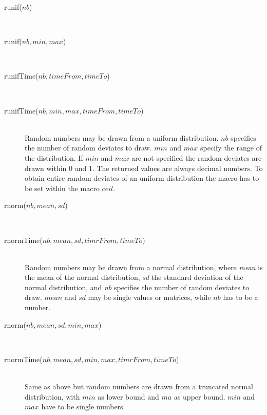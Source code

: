 \documentclass[letterpaper,12pt,oneside]{book}
\begin{document}
\begin{description}
\item[runif($nb$)]\hspace*{\fill}\\
\vspace{-9mm}
\item[runif($nb, min, max$)]\hspace*{\fill}\\
\vspace{-9mm}
\item[runifTime($nb, timeFrom, timeTo$)]\hspace*{\fill}\\
\vspace{-9mm}
\item[runifTime($nb, min, max, timeFrom, timeTo$)]\hspace*{\fill}\\
Random numbers may be drawn from a uniform distribution. $nb$ specifies the number of random deviates to draw. $min$ and $max$ specify the range of the distribution. If $min$ and $max$ are not specified the random deviates are drawn within 0 and 1. The returned values are always decimal numbers. To obtain entire random deviates of an uniform distribution the macro has to be set within the macro $ceil$.

\item[rnorm($nb, mean, sd$)]\hspace*{\fill}\\
\vspace{-9mm}
\item[rnormTime($nb, mean, sd, timrFrom, timeTo$)]\hspace*{\fill}\\
Random numbers may be drawn from a normal distribution, where \textit{mean} is the mean of the normal distribution, \textit{sd} the standard deviation of the normal distribution, and \textit{nb} specifies the number of random deviates to draw. $mean$ and $sd$ may be single values or matrices, while $nb$ has to be a number.

\item[rnorm($nb, mean, sd, min, max$)]\hspace*{\fill}\\
\vspace{-9mm}
\item[rnormTime($nb, mean, sd, min, max, timrFrom, timeTo$)]\hspace*{\fill}\\
Same as above but random numbers are drawn from a truncated normal distribution, with $min$ as lower bound and $ma$ as upper bound. $min$ and $max$ have to be single numbers.


\end{description}
\end{document}
